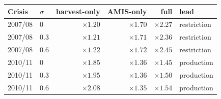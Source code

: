 \begin{tabular}{l l rrr l}
\toprule
Crisis & \(\sigma\) & harvest-only & AMIS-only & full & lead \\
\midrule
2007/08 & 0   & $\times 1.20$ & $\times 1.70$ & $\times 2.27$ & restriction \\
2007/08 & 0.3 & $\times 1.21$ & $\times 1.71$ & $\times 2.36$ & restriction \\
2007/08 & 0.6 & $\times 1.22$ & $\times 1.72$ & $\times 2.45$ & restriction \\
\midrule
2010/11 & 0   & $\times 1.85$ & $\times 1.36$ & $\times 1.45$ & production \\
2010/11 & 0.3 & $\times 1.95$ & $\times 1.36$ & $\times 1.50$ & production \\
2010/11 & 0.6 & $\times 2.08$ & $\times 1.35$ & $\times 1.54$ & production \\
\bottomrule
\end{tabular}
